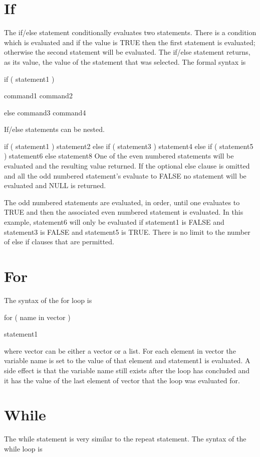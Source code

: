 \documentclass[a4paper,11pt]{scrartcl}
\begin{document}
\section{If}
\label{sec:If}
The if/else statement conditionally evaluates two statements. There is a condition which is evaluated and if the value is TRUE then the first statement is evaluated; otherwise the second statement will be evaluated. The if/else statement returns, as its value, the value of the statement that was selected. The formal syntax is

     if ( statement1 ) {
         command1
         command2
         
         }
     else
        {
        command3
        command4
        }      
        


If/else statements can be nested.

     if ( statement1 )
         statement2
     else if ( statement3 )
         statement4
     else if ( statement5 )
         statement6
     else
         statement8
One of the even numbered statements will be evaluated and the resulting value returned. If the optional else clause is omitted and all the odd numbered statement's evaluate to FALSE no statement will be evaluated and NULL is returned.

The odd numbered statements are evaluated, in order, until one evaluates to TRUE and then the associated even numbered statement is evaluated. In this example, statement6 will only be evaluated if statement1 is FALSE and statement3 is FALSE and statement5 is TRUE. There is no limit to the number of else if clauses that are permitted.

\section{For}
\label{sec:For}
The syntax of the for loop is

     for ( name in vector )
        
        statement1
        
        
where vector can be either a vector or a list. For each element in vector the variable name is set to the value of that element and statement1 is evaluated. A side effect is that the variable name still exists after the loop has concluded and it has the value of the last element of vector that the loop was evaluated for.

\section{While}
\label{sec:While}
The while statement is very similar to the repeat statement. The syntax of the while loop is
\end{document}
